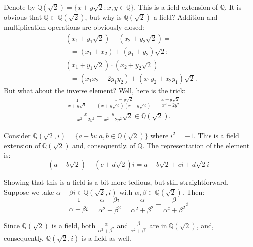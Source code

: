 \documentclass[../lecture-notes.tex]{subfiles}
\begin{document}
\begin{example}
    Denote by $\mathbb{Q}(\sqrt{2}) = \{x + y\sqrt{2}: x,y \in \mathbb{Q}\}$. This is a field extension of $\mathbb{Q}$. It is obvious that $\mathbb{Q} \subset \mathbb{Q}(\sqrt{2})$, but why is $\mathbb{Q}(\sqrt{2})$ a field? Addition and multiplication operations are obviously closed:
    \begin{equation*}
        \begin{aligned}
            &(x_1+y_1\sqrt{2}) + (x_2+y_2\sqrt{2}) = \\
            &\text{        } = (x_1+x_2) + (y_1+y_2)\sqrt{2}; \\
            &(x_1+y_1\sqrt{2}) \cdot (x_2+y_2\sqrt{2}) = \\
            &\text{        } = (x_1x_2+2y_1y_2) + (x_1y_2+x_2y_1)\sqrt{2}.
        \end{aligned}
    \end{equation*}
    But what about the inverse element? Well, here is the trick:
    \begin{equation*}
        \begin{aligned}
            \frac{1}{x+y\sqrt{2}} = \frac{x-y\sqrt{2}}{(x+y\sqrt{2})(x-y\sqrt{2})} = \frac{x-y\sqrt{2}}{x^2-2y^2} = \\
            = \frac{x}{x^2-2y^2} - \frac{y}{x^2-2y^2}\sqrt{2} \in \mathbb{Q}(\sqrt{2}).            
        \end{aligned}
    \end{equation*}
\end{example}

\begin{example}
    Consider $\mathbb{Q}(\sqrt{2}, i) = \{a+bi: a,b \in \mathbb{Q}(\sqrt{2})\}$ where $i^2=-1$. This is a field extension of $\mathbb{Q}(\sqrt{2})$ and, consequently, of $\mathbb{Q}$. The representation of the element is:
    \begin{equation*}
        (a+b\sqrt{2}) + (c+d\sqrt{2})i = a + b\sqrt{2} + ci + d\sqrt{2}i
    \end{equation*}

    Showing that this is a field is a bit more tedious, but still straightforward. Suppose we take $\alpha+\beta i \in \mathbb{Q}(\sqrt{2}, i)$ with $\alpha,\beta \in \mathbb{Q}(\sqrt{2})$. Then:
    \begin{equation*}
        \frac{1}{\alpha+\beta i} = \frac{\alpha-\beta i}{\alpha^2+\beta^2} = \frac{\alpha}{\alpha^2+\beta^2} - \frac{\beta}{\alpha^2+\beta^2}i
    \end{equation*}

    Since $\mathbb{Q}(\sqrt{2})$ is a field, both $\frac{\alpha}{\alpha^2+\beta^2}$ and $\frac{\beta}{\alpha^2+\beta^2}$ are in $\mathbb{Q}(\sqrt{2})$, and, consequently, $\mathbb{Q}(\sqrt{2}, i)$ is a field as well.
\end{example}
\end{document}

